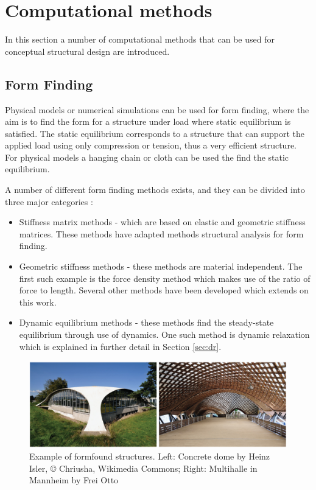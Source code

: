 \chapter{Computational methods}
\label{ch:Computational methods}
In this section a number of computational methods that can be used for conceptual structural design are introduced. 

\section{Form Finding}
Physical models or numerical simulations can be used for form finding, where the aim is to find the form for a structure under load where static equilibrium is satisfied. The static equilibrium corresponds to a structure that can support the applied load using only compression or tension, thus a very efficient structure. For physical models a hanging chain or cloth can be used the find the static equilibrium.

A number of different form finding methods exists, and they can be divided into three major categories \cite{Veenendaal2012a}: 

\begin{itemize} 
\item Stiffness matrix methods - which are based on elastic and geometric stiffness matrices. These methods have adapted methods structural analysis for form finding.
\item Geometric stiffness methods - these methods are material independent. The first such example is the force density method \cite{Schek1974} which makes use of the ratio of force to length. Several other methods have been developed which extends on this work.
\item Dynamic equilibrium methods - these methods find the steady-state equilibrium through use of dynamics. One such method is dynamic relaxation \cite{Day1965} which is explained in further detail in Section \ref{sec:dr}.
\end{itemize} 

\begin{figure}
  \includegraphics[width=380pt]{graphics/formfinding-ex.jpg}
  \caption{Example of formfound structures. Left: Concrete dome by Heinz Isler, © Chriusha, Wikimedia Commons; Right: Multihalle in Mannheim by Frei Otto }
  \label{fig:Stevin}
\end{figure}

